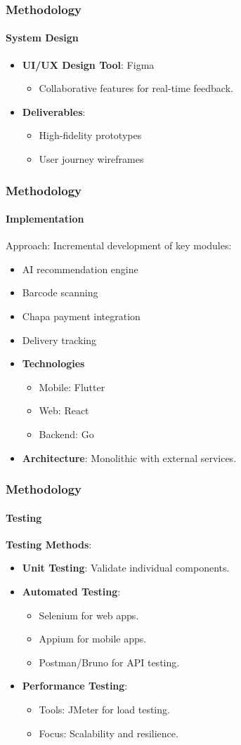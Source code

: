 \documentclass{beamer}
\begin{document}
\begin{frame}
	\frametitle{Methodology}
	\framesubtitle{System Design}
	\begin{itemize}
		\item \textbf{UI/UX Design Tool}: Figma
		      \begin{itemize}
			      \item Collaborative features for real-time feedback.
		      \end{itemize}
		\item \textbf{Deliverables}:
		      \begin{itemize}
			      \item High-fidelity prototypes
			      \item User journey wireframes
		      \end{itemize}
	\end{itemize}
\end{frame}

\begin{frame}
	\frametitle{Methodology}
	\framesubtitle{Implementation}
	Approach: Incremental development of key modules:
	\begin{itemize}
		\item AI recommendation engine
		\item Barcode scanning
		\item Chapa payment integration
		\item Delivery tracking
		\item \textbf{Technologies}
		      \begin{itemize}
			      \item Mobile: Flutter
			      \item Web: React
			      \item Backend: Go
		      \end{itemize}
		\item \textbf{Architecture}: Monolithic with external services.
	\end{itemize}
\end{frame}

\begin{frame}
	\frametitle{Methodology}
	\framesubtitle{Testing}
	\textbf{Testing Methods}:
	\begin{itemize}
		\item \textbf{Unit Testing}: Validate individual components.
		\item \textbf{Automated Testing}:
		      \begin{itemize}
			      \item Selenium for web apps.
			      \item Appium for mobile apps.
			      \item Postman/Bruno for API testing.
		      \end{itemize}
		\item \textbf{Performance Testing}:
		      \begin{itemize}
			      \item Tools: JMeter for load testing.
			      \item Focus: Scalability and resilience.
		      \end{itemize}
	\end{itemize}
\end{frame}
\end{document}
